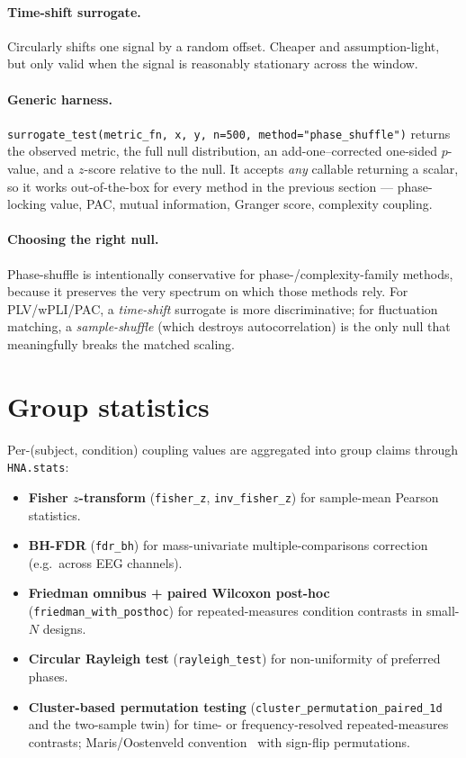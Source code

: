 \documentclass[11pt,a4paper]{article}
\begin{document}
\paragraph{Time-shift surrogate.} Circularly shifts one signal by a
random offset. Cheaper and assumption-light, but only valid when the
signal is reasonably stationary across the window.

\paragraph{Generic harness.}
\texttt{surrogate\_test(metric\_fn, x, y, n=500, method="phase\_shuffle")}
returns the observed metric, the full null distribution, an
add-one--corrected one-sided $p$-value, and a $z$-score relative to the
null. It accepts \emph{any} callable returning a scalar, so it works
out-of-the-box for every method in the previous section --- phase-locking
value, PAC, mutual information, Granger score, complexity coupling.

\paragraph{Choosing the right null.} Phase-shuffle is intentionally
conservative for phase-/complexity-family methods, because it preserves
the very spectrum on which those methods rely. For PLV/wPLI/PAC, a
\emph{time-shift} surrogate is more discriminative; for fluctuation
matching, a \emph{sample-shuffle} (which destroys autocorrelation) is
the only null that meaningfully breaks the matched scaling.

\section{Group statistics}

Per-(subject, condition) coupling values are aggregated into group claims
through \texttt{HNA.stats}:

\begin{itemize}
  \item \textbf{Fisher $z$-transform} (\texttt{fisher\_z}, \texttt{inv\_fisher\_z}) for
        sample-mean Pearson statistics.
  \item \textbf{BH-FDR} (\texttt{fdr\_bh}) for mass-univariate
        multiple-comparisons correction (e.g.\ across EEG channels).
  \item \textbf{Friedman omnibus + paired Wilcoxon post-hoc}
        (\texttt{friedman\_with\_posthoc}) for repeated-measures
        condition contrasts in small-$N$ designs.
  \item \textbf{Circular Rayleigh test} (\texttt{rayleigh\_test}) for
        non-uniformity of preferred phases.
  \item \textbf{Cluster-based permutation testing}
        (\texttt{cluster\_permutation\_paired\_1d} and the two-sample
        twin) for time- or frequency-resolved repeated-measures
        contrasts; Maris/Oostenveld convention~\cite{MarisOostenveld2007}
        with sign-flip permutations.
\end{itemize}
\end{document}
